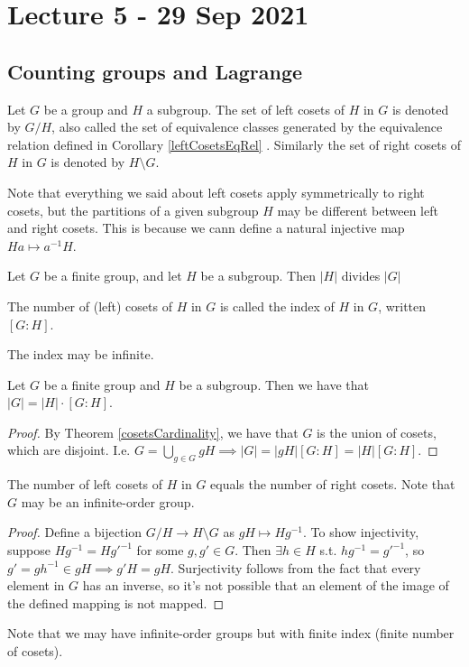 \section{Lecture 5 - 29 Sep 2021}
\subsection{Counting groups and Lagrange}
\begin{definition}
  Let $G$ be a group and $H$ a subgroup. The set of left cosets of $H$ in $G$ is denoted
  by $G/H$, also called the set of equivalence classes generated by the equivalence
  relation defined in Corollary \ref{leftCosetsEqRel} . Similarly the set of right cosets of
  $H$ in $G$ is denoted by $H\setminus G$.
  \label{cosets}
\end{definition}
Note that everything we said about left cosets apply symmetrically to right cosets, but
the partitions of a given subgroup $H$ may be different between left and right cosets.
This is because we cann define a natural injective map $Ha\mapsto a^{-1}H$.

\begin{corollary}
  Let $G$ be a finite group, and let $H$ be a subgroup. Then $|H|$ divides $|G|$
\end{corollary}

\begin{definition}
  The number of (left) cosets of $H$ in $G$ is called the index of $H$ in $G$, written
  $[G:H]$.
\end{definition}
The index may be infinite.

\begin{corollary}
  Let $G$ be a finite group and $H$ be a subgroup. Then we have that $|G|=|H| \cdot [G:H]$.
  \label{lagrange}
\end{corollary}
\begin{proof}
  By Theorem \ref{cosetsCardinality}, we have that $G$ is the union of cosets, which are
  disjoint. I.e. $G=\bigcup_{g\in G} gH\implies |G|=|gH|[G:H]=|H|[G:H]$.
\end{proof}

\begin{theorem}
  The number of left cosets of $H$ in $G$ equals the number of right cosets. Note that $G$
  may be an infinite-order group.
\end{theorem}
\begin{proof}
  Define a bijection $G/H\to H\setminus G$ as $gH\mapsto Hg^{-1}$. To show injectivity,
  suppose $Hg^{-1}=Hg'^{-1}$ for some $g,g'\in G$. Then $\exists h\in H$ s.t.
  $hg^{-1} = g'^{-1}$, so $g' = gh^{-1}\in gH \implies g'H=gH$. Surjectivity follows from
  the fact that every element in $G$ has an inverse, so it's not possible that an element
  of the image of the defined mapping is not mapped.
\end{proof}
Note that we may have infinite-order groups but with finite index (finite number of
cosets).


